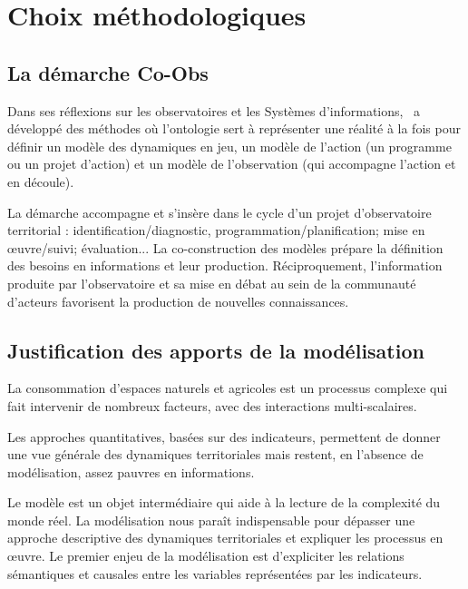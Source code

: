 \section
{Choix méthodologiques}

\subsection{La démarche Co-Obs}

\startplacefigure[location=middle,title={La démarche Co-Obs}]
\stopplacefigure

Dans ses réflexions sur les observatoires et les Systèmes d'informations,
\TETIS\ a développé des méthodes où l'ontologie sert à représenter une réalité
à la fois pour définir un modèle des dynamiques en jeu,
un modèle de l'action (un programme ou un projet d'action)
et un modèle de l'observation (qui accompagne l'action et en découle). 

La démarche accompagne et s'insère dans le cycle d'un projet d'observatoire territorial :
identification/diagnostic, programmation/planification; mise en œuvre/suivi; évaluation... 
La co-construction des modèles prépare la définition des besoins en informations et leur production.
Réciproquement, l’information produite par l’observatoire et sa mise en débat au sein de la communauté 
d’acteurs favorisent la production de nouvelles connaissances.


\subsection{Justification des apports de la modélisation}

La consommation d'espaces naturels et agricoles
est un processus complexe qui fait intervenir de nombreux facteurs,
avec des interactions multi-scalaires.

Les approches quantitatives, basées sur des indicateurs, permettent de donner
une vue générale des dynamiques territoriales mais restent,
en l'absence de modélisation, assez pauvres en informations.

Le modèle est un objet intermédiaire
qui aide à la lecture de la complexité du monde réel.
La modélisation nous paraît indispensable pour dépasser
une approche descriptive des dynamiques territoriales
et expliquer les processus en œuvre.
Le premier enjeu de la modélisation est d'expliciter les relations sémantiques
et causales entre les variables représentées par les indicateurs.

